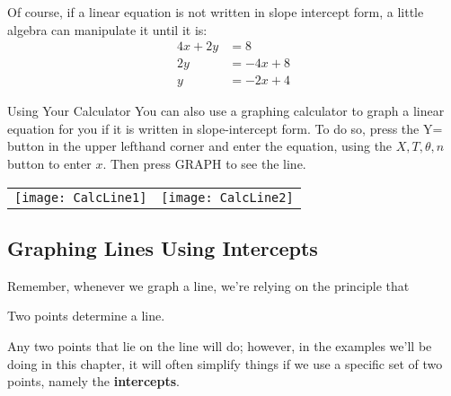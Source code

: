 Of course, if a linear equation is not written in slope intercept form, a little algebra can manipulate it until it is:
\begin{align*}
4x+2y &= 8\\
2y &= -4x +8\\
y &= -2x+4
\end{align*}

\begin{proc}{Using Your Calculator}
You can also use a graphing calculator to graph a linear equation for you if it is written in slope-intercept form.  To do so, press the Y= button in the upper lefthand corner and enter the equation, using the $X,T,\theta,n$ button to enter $x$.  Then press GRAPH to see the line.
\begin{center}
\begin{tabular}{c c}
\texttt{[image: CalcLine1]} & \hspace{0.5in} \texttt{[image: CalcLine2]}
\end{tabular}
\end{center}
\end{proc}

\subsection{Graphing Lines Using Intercepts}
Remember, whenever we graph a line, we're relying on the principle that
\begin{center}
\begin{minipage}{0.5\textwidth}
\begin{tcolorbox}[colframe=brown!40,colback=brown!10,sharp corners=all]
\begin{center}
Two points determine a line.
\end{center}
\end{tcolorbox}
\end{minipage}
\end{center}

Any two points that lie on the line will do; however, in the examples we'll be doing in this chapter, it will often simplify things if we use a specific set of two points, namely the \textbf{intercepts}.

